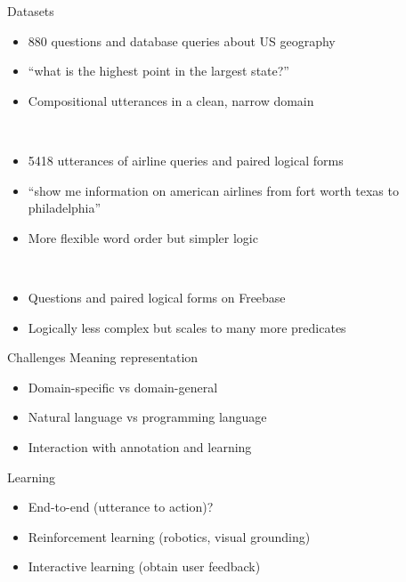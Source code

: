 \documentclass[usenames,dvipsnames,notes]{beamer}
\begin{document}
\begin{frame}
    {Datasets}
    \\
    \begin{itemize}
        \item 880 questions and database queries about US geography
        \item ``what is the highest point in the largest state?''
        \item Compositional utterances in a clean, narrow domain
    \end{itemize}

    \\
    \begin{itemize}
        \item 5418 utterances of airline queries and paired logical forms
        \item ``show me information on american airlines from fort worth texas to philadelphia''
        \item More flexible word order but simpler logic
    \end{itemize}

    \\
    \begin{itemize}
        \item Questions and paired logical forms on Freebase
        \item Logically less complex but scales to many more predicates
    \end{itemize}
\end{frame}

\begin{frame}
    {Challenges}
        Meaning representation
        \begin{itemize}
            \item Domain-specific vs domain-general 
            \item Natural language vs programming language 
            \item Interaction with annotation and learning
        \end{itemize}

        Learning
        \begin{itemize}
            \item End-to-end (utterance to action)?
            \item Reinforcement learning (robotics, visual grounding)
            \item Interactive learning (obtain user feedback)
        \end{itemize}


\end{frame}
\end{document}
